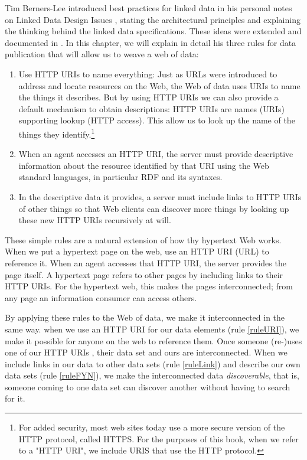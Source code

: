 Tim Berners-Lee introduced best practices for linked data in his
personal notes on Linked Data Design Issues \cite{linkeddatadesign}, stating the
architectural principles and explaining the thinking behind the linked data
specifications.  These ideas were extended and documented in \cite{heath2011linked}.  In this chapter, we will explain in detail his three rules 
for data publication that will allow us to weave a web of data:



\begin{enumerate}
\def\labelenumi{\arabic{enumi}.}
\item
\label{ruleURI}
  Use HTTP URIs to name everything: Just as URLs were introduced to
  address and locate resources on the Web, the Web of data uses URIs to
  name the things it describes. But by using HTTP URIs we can also
  provide a default mechanism to obtain descriptions: HTTP URIs are
  names (URIs) supporting lookup (HTTP access). This allow us to
  look up the name of the things they identify.\footnote{For added security,
  most web sites today use a more secure version of the HTTP protocol, called HTTPS. 
  For the purposes of this book, when we refer to a "HTTP URI", we include URIS
  that use the HTTP protocol.}
\item
\label{ruleFYN}
  When an agent accesses an HTTP URI, the server must provide descriptive
  information about the resource identified by that URI using the Web
  standard languages, in particular RDF and its syntaxes.
\item
\label{ruleLink}
  In the descriptive data it provides, a server must include links to
  HTTP URIs of other things so that Web clients can discover more things
  by looking up these new HTTP URIs recursively at will.
\end{enumerate}

These simple rules are a natural extension of how thy hypertext Web works. When we put a hypertext page 
on the web, use an HTTP URI (URL) to reference it.  When an agent accesses that HTTP URI, the server provides 
the page itself.  A hypertext page refers to other pages by including links to their HTTP URIs. 
For the hypertext web, this makes the pages interconnected; from any page an 
information consumer can access others.

By applying these  rules to the Web of data, we make it interconnected in the same way.  
when we use an HTTP URI   for our data elements (rule \ref{ruleURI}), 
we make it possible for anyone on the web to reference them. Once someone
(re-)uses one of our HTTP URIs , their data set and ours
are interconnected.  When we include links in our data to 
other data sets (rule \ref{ruleLink}) and  describe our own 
data sets (rule \ref{ruleFYN}), we make 
the interconnected data \emph{discoverable}, that is, 
someone coming to one data set can discover another
without having to search for it. 


